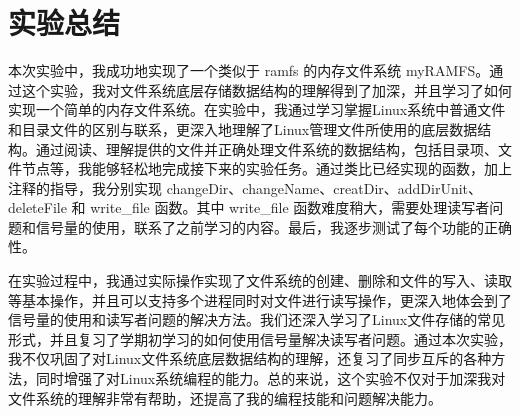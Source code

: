 \documentclass[a4paper,twoside]{article}
\begin{document}
\begin{spacing}{1.2}
\inputminted[firstline=412,lastline=436]{cpp}{../code/File.cpp}


\section{实验总结}

本次实验中，我成功地实现了一个类似于 ramfs 的内存文件系统 myRAMFS。通过这个实验，我对文件系统底层存储数据结构的理解得到了加深，并且学习了如何实现一个简单的内存文件系统。在实验中，我通过学习掌握Linux系统中普通文件和目录文件的区别与联系，更深入地理解了Linux管理文件所使用的底层数据结构。通过阅读、理解提供的文件并正确处理文件系统的数据结构，包括目录项、文件节点等，我能够轻松地完成接下来的实验任务。通过类比已经实现的函数，加上注释的指导，我分别实现 changeDir、changeName、creatDir、addDirUnit、deleteFile 和 write\_file 函数。其中 write\_file 函数难度稍大，需要处理读写者问题和信号量的使用，联系了之前学习的内容。最后，我逐步测试了每个功能的正确性。

在实验过程中，我通过实际操作实现了文件系统的创建、删除和文件的写入、读取等基本操作，并且可以支持多个进程同时对文件进行读写操作，更深入地体会到了信号量的使用和读写者问题的解决方法。我们还深入学习了Linux文件存储的常见形式，并且复习了学期初学习的如何使用信号量解决读写者问题。通过本次实验，我不仅巩固了对Linux文件系统底层数据结构的理解，还复习了同步互斥的各种方法，同时增强了对Linux系统编程的能力。总的来说，这个实验不仅对于加深我对文件系统的理解非常有帮助，还提高了我的编程技能和问题解决能力。

\end{spacing}
\end{document}
